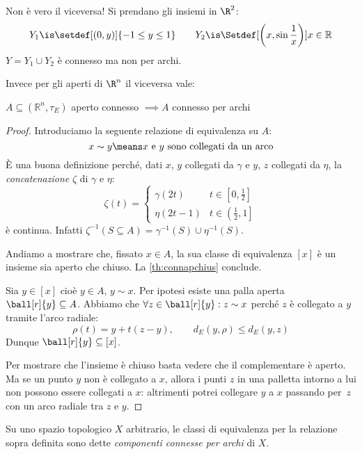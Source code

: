 \begin{ex}
	Non è vero il viceversa! Si prendano gli insiemi in $\R^2$:
	\[Y_1\is\setdef[(0,y)]{-1\le y \le 1}\qquad
	Y_2\is\Setdef[\left(x,\sin\frac{1}{x}\right)]{x\in \mathbb R}\]
	$Y=Y_1\cup Y_2$ è connesso ma non per archi. 
\end{ex}

Invece per gli aperti di $\R^n$ il viceversa vale:

\begin{prop}
	$A\subseteq (\mathbb R^n, \tau _E)$ aperto connesso $\implies A$ connesso per archi
\end{prop}

\begin{proof}
	Introduciamo la seguente relazione di equivalenza su $A$:
	\[x\sim y \means \text{$x$ e $y$ sono collegati da un arco}\]
	È una buona definizione perché,
	dati $x$, $y$ collegati da $\gamma$ e $y$, $z$ collegati da $\eta$,
	la \emph{concatenazione} $\zeta$ di $\gamma$ e $\eta$:
	\[\zeta(t)=
	\begin{cases}
		\gamma(2t) & t\in\left[0,\frac12\right] \\
		\eta(2t-1) & t\in\left(\frac12,1\right]
	\end{cases}\]
	è continua.
	Infatti $\zeta^{-1}(S\subseteq A)=\gamma^{-1}(S)\cup\eta^{-1}(S)$.

	Andiamo a mostrare che, fissato $x\in A$,
	la sua classe di equivalenza $[x]$ è un insieme sia aperto che chiuso.
	La \autoref{th:connapchius} conclude.

	Sia $y\in[x]$ cioè $y\in A$, $y\sim x$.
	Per ipotesi esiste una palla aperta $\ball[r]{y}\subseteq A$.
	Abbiamo che $\forall z\in \ball[r]{y}:z\sim x$
	perché $z$ è collegato a $y$ tramite l'arco radiale:
	\[\rho(t)=y+t(z-y),\qquad d_E(y,\rho)\le d_E(y,z)\]
	Dunque $\ball[r]{y}\subseteq [x]$.

	Per mostrare che l'insieme è chiuso basta vedere che il complementare è aperto.
	Ma se un punto $y$ non è collegato a $x$,
	allora i punti $z$ in una palletta intorno a lui non possono essere collegati a $x$:
	altrimenti potrei collegare $y$ a $x$ passando per~$z$ con un arco radiale tra $z$ e $y$.
\end{proof}

\begin{defn}
	Su uno spazio topologico $X$ arbitrario,
	le classi di equivalenza per la relazione sopra definita sono dette
	\emph{componenti connesse per archi} di $X$.
\end{defn}

